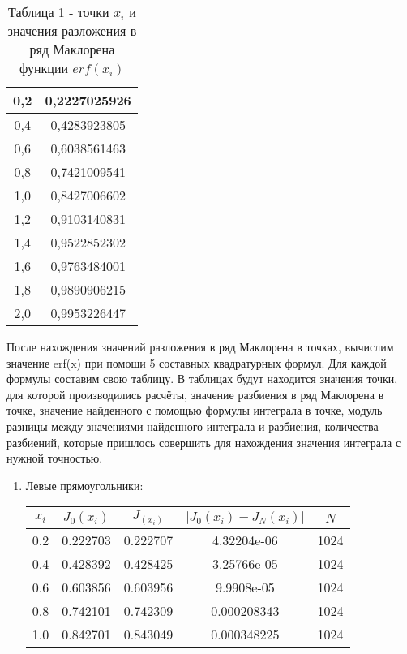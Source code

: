 \documentclass[a4paper,12pt]{article}
\begin{document}
{\begin{table}[h]
\begin{tabular}{|c|c|}
        \hline
        0,2 & 0,2227025926\\
        \hline
        0,4 & 0,4283923805\\
        \hline
        0,6 & 0,6038561463\\
        \hline
        0,8 & 0,7421009541\\
        \hline
        1,0 & 0,8427006602\\
        \hline
        1,2 & 0,9103140831\\
        \hline
        1,4 & 0,9522852302\\
        \hline
        1,6 & 0,9763484001\\
        \hline
        1,8 & 0,9890906215\\
        \hline
        2,0 & 0,9953226447\\
        \hline
    \end{tabular}
    \caption*{\small{Таблица 1 - точки $x_i$ и значения разложения в ряд Маклорена функции $erf(x_i)$}}
\end{table}
\newpage
После нахождения значений разложения в ряд Маклорена в точках, вычислим значение erf(x) при помощи 5 составных квадратурных формул. Для каждой формулы составим свою таблицу. В таблицах будут находится значения точки, для которой производились расчёты, значение разбиения в ряд Маклорена в точке, значение найден\-ного с помощью формулы интеграла в точке, модуль разницы между значениями найде\-нного интеграла и разбиения, количества разбиений, которые пришлось совершить для нахожде\-ния значения интеграла с нужной точностью.
\begin{enumerate}[label = \arabic*.]
    \item {Левые прямоугольники:
        \begin{table}[h]
        \centering
        \begin{tabular}{|c|c|c|c|c|}
            \hline
            $x_i$ & $J_0(x_i)$ & $J_(x_i)$ & $\left|J_0(x_i) - J_N(x_i)\right|$ & $N$\\
            \hline
            0.2 &  0.222703 &  0.222707 & 4.32204e-06 & 1024\\
            \hline
            0.4 &  0.428392 &  0.428425 & 3.25766e-05 & 1024\\
            \hline
            0.6 &  0.603856 &  0.603956 &  9.9908e-05 & 1024\\
            \hline
            0.8 &  0.742101 &  0.742309 & 0.000208343 & 1024\\
            \hline
            1.0 &  0.842701 &  0.843049 & 0.000348225 & 1024\\

\end{tabular}
\end{table}}
\end{enumerate}}
\end{document}
